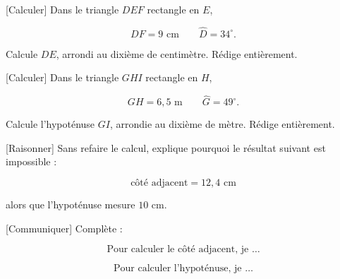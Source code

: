 \documentclass[12pt,a4paper]{article}
\begin{document}

[Calculer]
Dans le triangle \(DEF\) rectangle en \(E\),

\[
DF=9\text{ cm}
\qquad
\widehat D=34^\circ.
\]

Calcule \(DE\), arrondi au dixième de centimètre.
Rédige entièrement. 


[Calculer]
Dans le triangle \(GHI\) rectangle en \(H\),

\[
GH=6{,}5\text{ m}
\qquad
\widehat G=49^\circ.
\]

Calcule l'hypoténuse \(GI\), arrondie au dixième de mètre.
Rédige entièrement. 


[Raisonner]
Sans refaire le calcul, explique pourquoi le résultat suivant est impossible :

\[
\text{côté adjacent}=12{,}4\text{ cm}
\]

alors que l'hypoténuse mesure \(10\) cm. 


[Communiquer]
Complète :

\[
\text{Pour calculer le côté adjacent, je }\ldots
\]

\[
\text{Pour calculer l'hypoténuse, je }\ldots
\]

\end{document}
